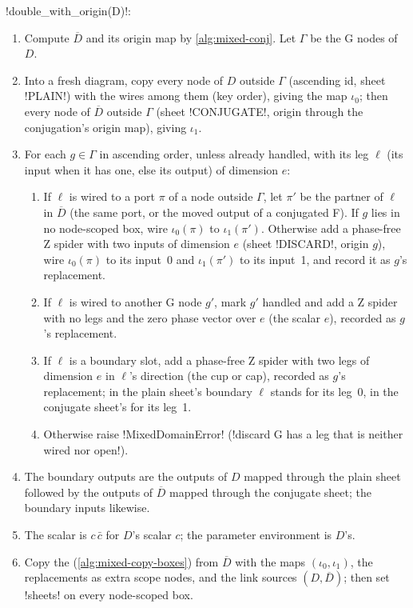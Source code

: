 \begin{algorithm}[Doubling]\label{alg:mixed-double}
\py!double_with_origin(D)!:
\begin{enumerate}
\item Compute $\overline D$ and its origin map by \cref{alg:mixed-conj}. Let $\Gamma$ be the G nodes of $D$.
\item Into a fresh diagram, copy every node of $D$ outside $\Gamma$ (ascending id, sheet \code!PLAIN!) with the wires among them (key order), giving the map $\iota_0$; then every node of $\overline D$ outside $\Gamma$ (sheet \code!CONJUGATE!, origin through the conjugation's origin map), giving $\iota_1$.
\item For each $g\in\Gamma$ in ascending order, unless already handled, with its leg $\ell$ (its input when it has one, else its output) of dimension $e$:
\begin{enumerate}
\item If $\ell$ is wired to a port $\pi$ of a node outside $\Gamma$, let $\pi'$ be the partner of $\ell$ in $\overline D$ (the same port, or the moved output of a conjugated F). If $g$ lies in no node-scoped box, wire $\iota_0(\pi)$ to $\iota_1(\pi')$. Otherwise add a phase-free Z spider with two inputs of dimension $e$ (sheet \code!DISCARD!, origin $g$), wire $\iota_0(\pi)$ to its input~0 and $\iota_1(\pi')$ to its input~1, and record it as $g$'s replacement.
\item If $\ell$ is wired to another G node $g'$, mark $g'$ handled and add a Z spider with no legs and the zero phase vector over $e$ (the scalar $e$), recorded as $g$'s replacement.
\item If $\ell$ is a boundary slot, add a phase-free Z spider with two legs of dimension $e$ in $\ell$'s direction (the cup or cap), recorded as $g$'s replacement; in the plain sheet's boundary $\ell$ stands for its leg~0, in the conjugate sheet's for its leg~1.
\item Otherwise raise \py!MixedDomainError! (\code!discard G has a leg that is neither wired nor open!).
\end{enumerate}
\item The boundary outputs are the outputs of $D$ mapped through the plain sheet followed by the outputs of $\overline D$ mapped through the conjugate sheet; the boundary inputs likewise.
\item The scalar is $c\,\bar c$ for $D$'s scalar $c$; the parameter environment is $D$'s.
\item Copy the \bboxes{} (\cref{alg:mixed-copy-boxes}) from $\overline D$ with the maps $(\iota_0,\iota_1)$, the replacements as extra scope nodes, and the link sources $(D,\overline D)$; then set \py!sheets! on every node-scoped box.
\end{enumerate}
\end{algorithm}

